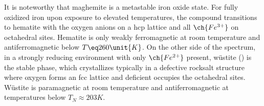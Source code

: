 \documentclass[\main/dresen_thesis.tex]{subfiles}
\renewcommand{\thisPath}{\main/chapters/theoreticalBackground/ferrites}
\begin{document}
  It is noteworthy that maghemite is a metastable iron oxide state.
  For fully oxidized iron upon exposure to elevated temperatures, the compound transitions to hematite with the oxygen anions on a hcp lattice and  all $\ch{Fe^{3+}}$ on octahedral sites.
  Hematite is only weakly ferromagnetic at room temperature and antiferromagnetic below $T \eq 260 \unit{K}$.
  On the other side of the spectrum, in a strongly reducing environment with only $\ch{Fe^{2+}}$ present, w\"ustite () is the stable phase, which crystallizes typically in a defective rocksalt structure where oxygen forms an fcc lattice and deficient  occupies the octahedral sites.
  W\"ustite is paramagnetic at room temperature and antiferromagnetic at temperatures below $T_N \approx 203 K$.

  
  
\end{document}
